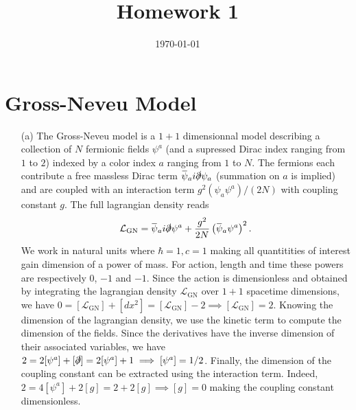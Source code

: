 \documentclass[10pt, a4paper]{article}
\title{Homework 1} %
\author{\PA} %
\date{\today} %
\begin{document}
\section{Gross-Neveu Model}

\begin{enumerate}
  \item[(a)] The Gross-Neveu model is a $1+1$ dimensionnal model describing a collection of $N$ fermionic fields $\psi^a$ (and a supressed Dirac index ranging from $1$ to $2$) indexed by a color index $a$ ranging from $1$ to $N$. The fermions each contribute a free massless Dirac term $\bar{\psi}_a i \slashed{\partial} \psi_a$ (summation on $a$ is implied) and are coupled with an interaction term $g^2 (\psi_a \psi^a)/(2N)$ with coupling constant $g$. The full lagrangian density reads
  \begin{align*}
    \mathcal{L}_{\mathrm{GN}}=\bar{\psi}_a i \slashed{\partial} \psi^a+\frac{g^2}{2 N}\left(\bar{\psi}_a \psi^a\right)^2. 
  \end{align*}
  We work in natural units where $\hbar = 1, c = 1$ making all quantitities of interest gain dimension of a power of mass. For action, length and time these powers are respectively $0$, $-1$ and $-1$. Since the action is dimensionless and obtained by integrating the lagrangian density $\mathcal{L}_{\mathrm{GN}}$ over $1+1$ spacetime dimensions, we have $0 = [\mathcal{L}_{\mathrm{GN}}] +  [dx^2] = [\mathcal{L}_{\mathrm{GN}}] - 2 \implies [\mathcal{L}_{\mathrm{GN}}] = 2$. Knowing the dimension of the lagrangian density, we use the kinetic term to compute the dimension of the fields. Since the derivatives have the inverse dimension of their associated variables, we have $2 = 2[\psi^a] + [\slashed{\partial}] = 2[\psi^a] + 1 \implies [\psi^a] = 1/2$. Finally, the dimension of the coupling constant can be extracted using the interaction term. Indeed,  $2 = 4 [\psi^a] + 2 [g] = 2 + 2 [g] \implies [g] = 0$ making the coupling constant dimensionless. 

\end{enumerate}
\end{document}
